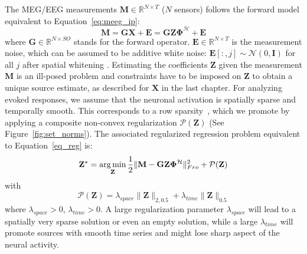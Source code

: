 The MEG/EEG measurements $\mathbf{M} \in \mathbb{R}^{N \times T}$ ($N$ sensors) follows the forward model equivalent to Equation~\eqref{eq:meeg_ip}:
\begin{equation} \label{eq:reg_prob_tf}
    \mathbf{M} = \mathbf{GX} + \mathbf{E} = \mathbf{GZ \Phi}^{\mathcal{H}} + \mathbf{E}
\end{equation}
where $\mathbf{G} \in \mathbb{R}^{N \times SO}$ stands for the forward operator. $\mathbf{E} \in \mathbb{R}^{N \times T}$ is the measurement noise, which can be assumed to be additive white noise: $\mathbf{E}[:, j] \sim \mathcal{N}(0, \mathbf{I})$ for all $j$ after spatial whitening \cite{denis}. Estimating the coefficients $\mathbf{Z}$ given the measurement $\mathbf{M}$ is an ill-posed problem and constraints have to be imposed on $\mathbf{Z}$ to obtain a unique source estimate, as described for $\mathbf{X}$ in the last chapter. For analyzing evoked responses, we assume that the neuronal activation is spatially sparse and temporally smooth. This corresponds to a row sparsity~\cite{Alex13}, which we promote by applying a composite non-convex regularization $\mathcal{P}(\mathbf{Z})$ (See Figure~\ref{fig:set_norms}). The associated regularized regression problem equivalent to Equation~\eqref{eq_reg} is:
\begin{equation} \label{eq:penalized_reg_tf}
    \mathbf{Z}^\star = \mathop{\mathrm{arg}\,\mathrm{min}}_{\mathbf{Z}} \frac{1}{2}\|\mathbf{M - GZ\Phi^\mathcal{H}}\|^2_{Fro} + \mathcal{P}(\mathbf{Z})
\end{equation}
with
\begin{equation}
	\mathcal{P}(\mathbf{Z}) = \lambda_{space}\|\mathbf{Z}\|_{2,0.5} + \lambda_{time}\|\mathbf{Z}\|_{0.5}
\end{equation}
where $\lambda_{space} > 0$, $\lambda_{time}>0$. A large regularization parameter $\lambda_{space}$ will lead to a spatially very sparse solution or even an empty solution, while a large $\lambda_{time}$ will promote sources with smooth time series and might lose sharp aspect of the neural activity.

